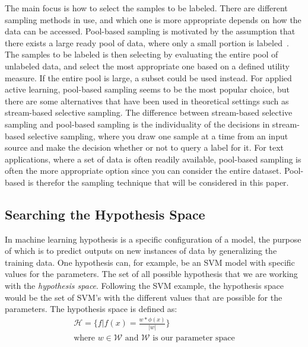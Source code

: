 The main focus is how to select the samples to be labeled.
There are different sampling methods in use, and which one is more appropriate depends on how the data can be accessed.
Pool-based sampling is motivated by the assumption that there exists a large ready pool of data, where only a small portion is labeled~\cite{lewis1994sequential, settles2012active}.
The samples to be labeled is then selecting by evaluating the entire pool of unlabeled data, and select the most appropriate one based on a defined utility measure.
If the entire pool is large, a subset could be used instead.
For applied active learning, pool-based sampling seems to be the most popular choice, but there are some alternatives that have been used in theoretical settings such as stream-based selective sampling.
The difference between stream-based selective sampling and pool-based sampling is the individuality of the decisions in stream-based selective sampling, where you draw one sample at a time from an input source and make the decision whether or not to query a label for it.
For text applications, where a set of data is often readily available, pool-based sampling is often the more appropriate option since you can consider the entire dataset.
Pool-based is therefor the sampling technique that will be considered in this paper.

\subsection{Searching the Hypothesis Space}

In machine learning hypothesis is a specific configuration of a model, the purpose of which is to predict outputs on new instances of data by generalizing the training data.
One hypothesis can, for example, be an SVM model with specific values for the parameters.
The set of all possible hypothesis that we are working with the \textit{hypothesis space}.
Following the SVM example, the hypothesis space would be the set of SVM's with the different values that are possible for the parameters.
The hypothesis space is defined as:
\begin{equation}
    \begin{aligned}
        \mathcal{H} = \Bigg \{ f | f(x) = \frac{w * \phi(x)}{|w|} \Bigg \}\\
        \text{where~$w \in \mathcal{W}$ and $\mathcal{W}$ is our parameter space}
    \end{aligned}
\end{equation}

